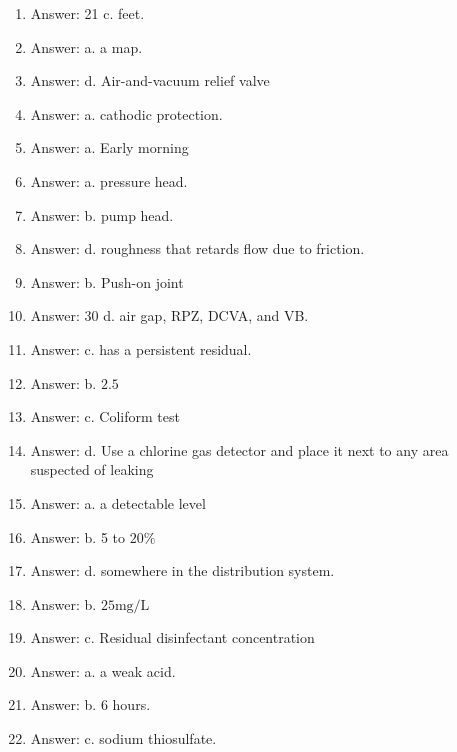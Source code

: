 \documentclass[10pt]{article}
\begin{document}
\begin{enumerate}
  \item Answer: 21 c. feet.

  \item Answer: a. a map.

  \item Answer: d. Air-and-vacuum relief valve

  \item Answer: a. cathodic protection.

  \item Answer: a. Early morning
  
  \item Answer: a. pressure head.

  \item Answer: b. pump head.

  \item Answer: d. roughness that retards flow due to friction.

  \item Answer: b. Push-on joint
  
  \item Answer: 30 d. air gap, RPZ, DCVA, and VB.

  \item Answer: c. has a persistent residual.

  \item Answer: b. $2.5$

  \item Answer: c. Coliform test

  \item Answer: d. Use a chlorine gas detector and place it next to any area suspected of leaking

  \item Answer: a. a detectable level

  \item Answer: b. 5 to $20 \%$

  \item Answer: d. somewhere in the distribution system.

  \item Answer: b. $25 \mathrm{mg} / \mathrm{L}$

  \item Answer: c. Residual disinfectant concentration

  \item Answer: a. a weak acid.
 
  \item Answer: b. 6 hours.

  \item Answer: c. sodium thiosulfate.


\end{enumerate}
\end{document}
